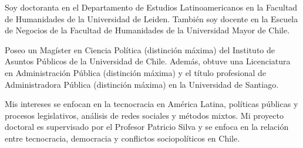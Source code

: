 




\par{Soy doctoranta en el Departamento de Estudios Latinoamericanos en la Facultad de Humanidades de la Universidad de Leiden. También soy docente en la Escuela de Negocios de la Facultad de Humanidades de la Universidad Mayor de Chile. 

Poseo un Magíster en Ciencia Política (distinción máxima) del Instituto de Asuntos Públicos de la Universidad de Chile. Además, obtuve una Licenciatura en Administración Pública (distinción máxima) y el título profesional de Administradora Pública (distinción máxima) en la Universidad de Santiago.

Mis intereses se enfocan en la tecnocracia en América Latina, políticas públicas y procesos legislativos, análisis de redes sociales y métodos mixtos. Mi proyecto doctoral es supervisado por el Profesor Patricio Silva y se enfoca en la relación entre tecnocracia, democracia y conflictos sociopolíticos en Chile.}\\